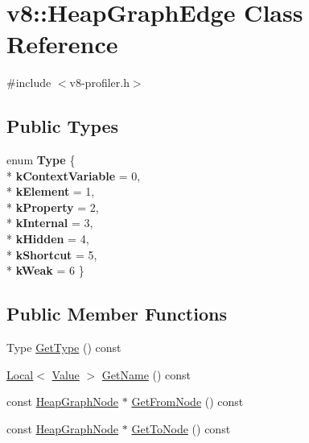 \hypertarget{classv8_1_1_heap_graph_edge}{}\section{v8\+:\+:Heap\+Graph\+Edge Class Reference}
\label{classv8_1_1_heap_graph_edge}


{\ttfamily \#include $<$v8-\/profiler.\+h$>$}

\subsection*{Public Types}
\begin{DoxyCompactItemize}
\item 
enum {\bfseries Type} \{ \\*
{\bfseries k\+Context\+Variable} = 0, 
\\*
{\bfseries k\+Element} = 1, 
\\*
{\bfseries k\+Property} = 2, 
\\*
{\bfseries k\+Internal} = 3, 
\\*
{\bfseries k\+Hidden} = 4, 
\\*
{\bfseries k\+Shortcut} = 5, 
\\*
{\bfseries k\+Weak} = 6
 \}\hypertarget{classv8_1_1_heap_graph_edge_a252500cf4307fe9e4fcb0335a907259b}{}\label{classv8_1_1_heap_graph_edge_a252500cf4307fe9e4fcb0335a907259b}

\end{DoxyCompactItemize}
\subsection*{Public Member Functions}
\begin{DoxyCompactItemize}
\item 
Type \hyperlink{classv8_1_1_heap_graph_edge_a7f4923098074ee4c47d901f363728d08}{Get\+Type} () const 
\item 
\hyperlink{classv8_1_1_local}{Local}$<$ \hyperlink{classv8_1_1_value}{Value} $>$ \hyperlink{classv8_1_1_heap_graph_edge_a295702dc31ef38dadb54143f2a76e12e}{Get\+Name} () const 
\item 
const \hyperlink{classv8_1_1_heap_graph_node}{Heap\+Graph\+Node} $\ast$ \hyperlink{classv8_1_1_heap_graph_edge_acd43a5082f1862b7c0c0094fc75af631}{Get\+From\+Node} () const 
\item 
const \hyperlink{classv8_1_1_heap_graph_node}{Heap\+Graph\+Node} $\ast$ \hyperlink{classv8_1_1_heap_graph_edge_ad8fd8fa121a0e778a8b120a0c5fa227c}{Get\+To\+Node} () const 
\end{DoxyCompactItemize}


